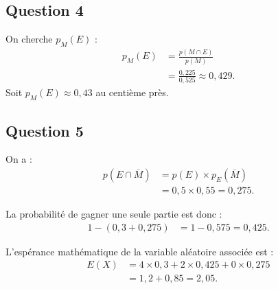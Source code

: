 \documentclass[10pt]{article}
\begin{document}
	\subsection*{Question 4}
	
	On cherche $p_M(E)$ :
	\begin{align*}
		p_M(E) &= \frac{p(M \cap E)}{p(M)} \\
		&= \frac{0,225}{0,525} \approx 0,429.
	\end{align*}
	Soit $p_M(E) \approx 0,43$ au centième près.
	
	\subsection*{Question 5}
	
	On a :
	\begin{align*}
		p(E \cap \overline{M}) &= p(E) \times p_E(\overline{M}) \\
		&= 0,5 \times 0,55 = 0,275.
	\end{align*}
	
	La probabilité de gagner une seule partie est donc :
	\begin{align*}
		1 - (0,3 + 0,275) &= 1 - 0,575 = 0,425.
	\end{align*}
	
	L'espérance mathématique de la variable aléatoire associée est :
	\begin{align*}
		E(X) &= 4 \times 0,3 + 2 \times 0,425 + 0 \times 0,275 \\
		&= 1,2 + 0,85 = 2,05.
	\end{align*}
\end{document}
